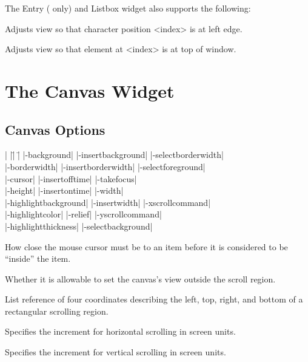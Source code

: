 \vskip5pt
The Entry ( only) and Listbox widget also supports the following:

\begin{enum}{1cm}

Adjusts view so that character position <index> is at left edge.

Adjusts view so that element at <index> is at top of window.

\end{enum}


\section{The Canvas Widget}

\subsection*{Canvas Options}
\begin{tabbing}
|                      |\=|                   |\= \kill
|-background|          \> |-insertbackground|   \> |-selectborderwidth|  \\
|-borderwidth|         \> |-insertborderwidth|  \> |-selectforeground| \\
|-cursor|    	       \> |-insertofftime|      \> |-takefocus|  \\
|-height|	       \> |-insertontime|       \> |-width| \\
|-highlightbackground| \> |-insertwidth|        \> |-xscrollcommand|    \\
|-highlightcolor|      \> |-relief|             \> |-yscrollcommand| \\
|-highlightthickness|  \> |-selectbackground|  \\
\end{tabbing}

\vskip5pt
\begin{enum}{1cm}

How close the mouse cursor must be to an item before it is considered
to be ``inside'' the item.

Whether it is allowable to set the canvas's view outside the scroll
region.

List reference of four coordinates describing the left, top, right, and bottom
of a rectangular scrolling region.

Specifies the increment for horizontal scrolling in screen units.

Specifies the increment for vertical scrolling in screen units.

\end{enum}

